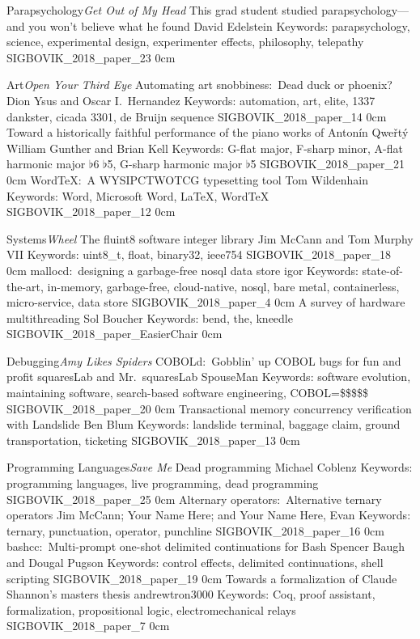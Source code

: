 \addtrack
	{Parapsychology}{\textit{Get Out of My Head}}
\addpaper
	{This grad student studied parapsychology---and you won't believe what he found}
	{David Edelstein}
	{Keywords: parapsychology, science, experimental design, experimenter effects, philosophy, telepathy}
	{SIGBOVIK_2018_paper_23}
	{0cm}
	{}

\addtrack
	{Art}{\textit{Open Your Third Eye}}
\addpaper
	{Automating art snobbiness:\ Dead duck or phoenix?}
	{Dion Ysus and Oscar I.\ Hernandez}
	{Keywords: automation, art, elite, 1337 dankster, cicada 3301, de Bruijn sequence}
	{SIGBOVIK_2018_paper_14}
	{0cm}
	{}
\addpaper
	{Toward a historically faithful performance of the piano works of Anton\'in Qwe\v{r}t\'y}
	{William Gunther and Brian Kell}
	{Keywords: G-flat major, F-sharp minor, A-flat harmonic major $\flat$6 $\flat$5, G-sharp harmonic major $\flat$5}
	{SIGBOVIK_2018_paper_21}
	{0cm}
	{}
\addpaper
	{WordTeX:\ A WYSIPCTWOTCG typesetting tool}
	{Tom Wildenhain}
	{Keywords: Word, Microsoft Word, LaTeX, WordTeX}
	{SIGBOVIK_2018_paper_12}
	{0cm}
	{}


\addtrack
	{Systems}{\textit{Wheel}}
\addpaper
	{The fluint8 software integer library}
	{Jim McCann and Tom Murphy VII}
	{Keywords: uint8\_t, float, binary32, ieee754}
	{SIGBOVIK_2018_paper_18}
	{0cm}
	{}
\addpaper
	{mallocd:\ designing a garbage-free nosql data store}
	{igor}
	{Keywords: state-of-the-art, in-memory, garbage-free, cloud-native, nosql, bare metal, containerless, micro-service, data store}
	{SIGBOVIK_2018_paper_4}
	{0cm}
	{}
\addpaper
	{A survey of hardware multithreading}
	{Sol Boucher}
	{Keywords: bend, the, kneedle}
	{SIGBOVIK_2018_paper_EasierChair}
	{0cm}
	{}

\addtrack
	{Debugging}{\textit{Amy Likes Spiders}}
\addpaper
	{COBOLd:\ Gobblin' up COBOL bugs for fun and profit}
	{squaresLab and Mr.\ squaresLab SpouseMan}
	{Keywords: software evolution, maintaining software, search-based software engineering, COBOL=\$\$\$\$\$}
	{SIGBOVIK_2018_paper_20}
	{0cm}
	{}
\addpaper
	{Transactional memory concurrency verification with Landslide}
	{Ben Blum}
	{Keywords: landslide terminal, baggage claim, ground transportation, ticketing}
	{SIGBOVIK_2018_paper_13}
	{0cm}
	{}

\addtrack
	{Programming Languages}{\textit{Save Me}}
\addpaper
	{Dead programming}
	{Michael Coblenz}
	{Keywords: programming languages, live programming, dead programming}
	{SIGBOVIK_2018_paper_25}
	{0cm}
	{}
\addpaper
	{Alternary operators:\ Alternative ternary operators}
	{Jim McCann; Your Name Here; and Your Name Here, Evan}
	{Keywords: ternary, punctuation, operator, punchline}
	{SIGBOVIK_2018_paper_16}
	{0cm}
	{}
\addpaper
	{bashcc:\ Multi-prompt one-shot delimited continuations for Bash}
	{Spencer Baugh and Dougal Pugson}
	{Keywords: control effects, delimited continuations, shell scripting}
	{SIGBOVIK_2018_paper_19}
	{0cm}
	{}
\addpaper
	{Towards a formalization of Claude Shannon's masters thesis}
	{andrewtron3000}
	{Keywords: Coq, proof assistant, formalization, propositional logic, electromechanical relays}
	{SIGBOVIK_2018_paper_7}
	{0cm}
	{}

